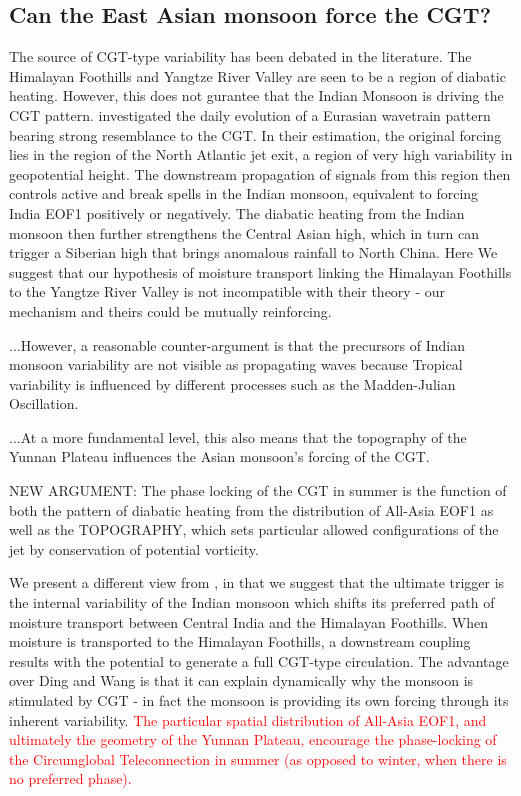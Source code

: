 \subsection{Can the East Asian monsoon force the CGT?}

	The source of CGT-type variability has been debated in the literature. The Himalayan Foothills and Yangtze River Valley are seen to be a region of diabatic heating. However, this does not gurantee that the Indian Monsoon is driving the CGT pattern. \citet{Ding2007} investigated the daily evolution of a Eurasian wavetrain pattern bearing strong resemblance to the CGT. In their estimation, the original forcing lies in the region of the North Atlantic jet exit, a region of very high variability in geopotential height. The downstream propagation of signals from this region then controls active and break spells in the Indian monsoon, equivalent to forcing India EOF1 positively or negatively. The diabatic heating from the Indian monsoon then further strengthens the Central Asian high, which in turn can trigger a Siberian high that brings anomalous rainfall to North China. Here We suggest that our hypothesis of moisture transport linking the Himalayan Foothills to the Yangtze River Valley \citep{Day2015} is not incompatible with their theory - our mechanism and theirs could be mutually reinforcing.

	...However, a reasonable counter-argument is that the precursors of Indian monsoon variability are not visible as propagating waves because Tropical variability is influenced by different processes such as the Madden-Julian Oscillation.

	...At a more fundamental level, this also means that the topography of the Yunnan Plateau influences the Asian monsoon's forcing of the CGT. 
	
	NEW ARGUMENT: The phase locking of the CGT in summer is the function of both the pattern of diabatic heating from the distribution of All-Asia EOF1 as well as the TOPOGRAPHY, which sets particular allowed configurations of the jet by conservation of potential vorticity.

	We present a different view from \citet{Ding2007}, in that we suggest that the ultimate trigger is the internal variability of the Indian monsoon which shifts its preferred path of moisture transport between Central India and the Himalayan Foothills. When moisture is transported to the Himalayan Foothills, a downstream coupling results with the potential to generate a full CGT-type circulation. The advantage over Ding and Wang is that it can explain dynamically why the monsoon is stimulated by CGT - in fact the monsoon is providing its own forcing through its inherent variability. \textcolor{red}{The particular spatial distribution of All-Asia EOF1, and ultimately the geometry of the Yunnan Plateau, encourage the phase-locking of the Circumglobal Teleconnection in summer (as opposed to winter, when there is no preferred phase).} 
	
